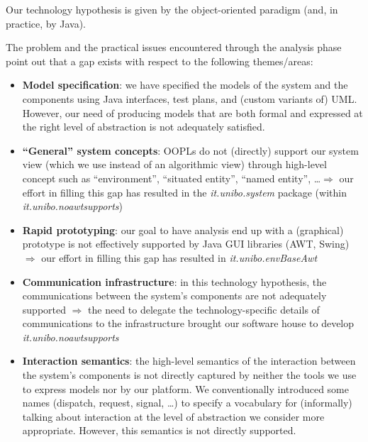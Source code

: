 \documentclass{article}
\begin{document}
Our technology hypothesis is given by the object-oriented paradigm 
 (and, in practice, by Java).

The problem and the practical issues encountered through the analysis phase
point out that a gap exists with respect to the following themes/areas:

\begin{itemize}
  \item \textbf{Model specification}: we have specified the models of the
  system and the components using Java interfaces, test plans, and (custom
  variants of) UML.
  However, our need of producing models that are both formal and expressed at the right
  level of abstraction is not adequately satisfied.
  
  \item \textbf{``General'' system concepts}: OOPLs do not (directly)
  support our system view (which we use instead of an algorithmic view) through
  high-level concept such as ``environment'', ``situated entity'', ``named
  entity'', \ldots $\Rightarrow$ our effort in filling this gap has resulted in
  the \emph{it.unibo.system} package (within \emph{it.unibo.noawtsupports})
  
  \item \textbf{Rapid prototyping}: our goal to have analysis end up with a
  (graphical) prototype is not effectively supported by Java GUI libraries
  (AWT, Swing) $\Rightarrow$ our effort in filling this gap has resulted in
  \emph{it.unibo.envBaseAwt}
  
  \item \textbf{Communication infrastructure}: in this technology hypothesis,
  the communications between the system's components are not adequately
  supported $\Rightarrow$ the need to delegate the technology-specific details of
  communications to the infrastructure brought our software house to develop
  \emph{it.unibo.noawtsupports}
  
  \item \textbf{Interaction semantics}: the high-level semantics of the
  interaction between the system's components is not directly captured by neither the tools we use
  to express models nor by our platform.  We conventionally
  introduced some names (dispatch, request, signal, \ldots) to
  specify a vocabulary for (informally) talking about interaction at the level
  of abstraction we consider more appropriate. However, this semantics is not
  directly supported.
\end{itemize}
 
\end{document}
